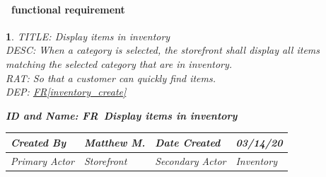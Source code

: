 \documentclass{scrreprt}
\theoremstyle{funreq}
\newtheorem{funreq}{}
\newcommand*{\reqref}[1]{\hyperref[#1]{FR\ref*{#1}}}
\begin{document}
\paragraph[]{\Subsectionname ~functional requirement }
\begin{funreq}
	\label{store_listcategory}
	TITLE: Display items in inventory\\
	DESC: When a category is selected, the storefront shall display all items matching the selected category that are in inventory.\\
	RAT: So that a customer can quickly find items.\\
	DEP: \reqref{inventory_create}\\
	

	\begin{table}[H]
		\begin{flushleft}\bfseries{ID and Name: FR\thefunreq ~\hspace{.6cm}Display items in inventory}\normalfont\end{flushleft}
		\begin{tabularx}{\columnwidth}{|X|X|X|X|}
			\hline
			Created By    & Matthew M. & Date Created    & 03/14/20 \\ \hline
			Primary Actor & Storefront        & Secondary Actor & Inventory \\ \hline
		\end{tabularx}
		

\end{table}
\end{funreq}
\end{document}
